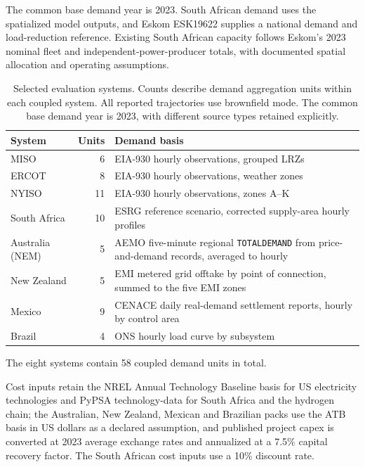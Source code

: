 \documentclass[pdflatex,sn-nature]{sn-jnl}
\begin{document}
The common base demand year is 2023. South African demand uses the spatialized model outputs, and Eskom ESK19622 supplies a national demand and load-reduction reference. Existing South African capacity follows Eskom's 2023 nominal fleet and independent-power-producer totals, with documented spatial allocation and operating assumptions.

\begin{table}[tbp]
\caption{Selected evaluation systems. Counts describe demand aggregation units within each coupled system. All reported trajectories use brownfield mode. The common base demand year is 2023, with different source types retained explicitly.}
\label{tab:regions}
\centering\small
\begin{tabularx}{\textwidth}{@{}lrX@{}}
\toprule
System & Units & Demand basis \\
\midrule
MISO & 6 & EIA-930 hourly observations, grouped LRZs \\
ERCOT & 8 & EIA-930 hourly observations, weather zones \\
NYISO & 11 & EIA-930 hourly observations, zones A--K \\
South Africa & 10 & ESRG reference scenario, corrected supply-area hourly profiles \\
Australia (NEM) & 5 & AEMO five-minute regional \texttt{TOTALDEMAND} from price-and-demand records, averaged to hourly \\
New Zealand & 5 & EMI metered grid offtake by point of connection, summed to the five EMI zones \\
Mexico & 9 & CENACE daily real-demand settlement reports, hourly by control area \\
Brazil & 4 & ONS hourly load curve by subsystem \\
\bottomrule
\end{tabularx}
\smallskip
\par\footnotesize The eight systems contain 58 coupled demand units in total.
\end{table}

Cost inputs retain the NREL Annual Technology Baseline basis for US electricity technologies and PyPSA technology-data for South Africa and the hydrogen chain\cite{nrel2024atb,pypsatechdata}; the Australian, New Zealand, Mexican and Brazilian packs use the ATB basis in US dollars as a declared assumption, and published project capex is converted at 2023 average exchange rates and annualized at a 7.5\% capital recovery factor. The South African cost inputs use a 10\% discount rate.
\end{document}
